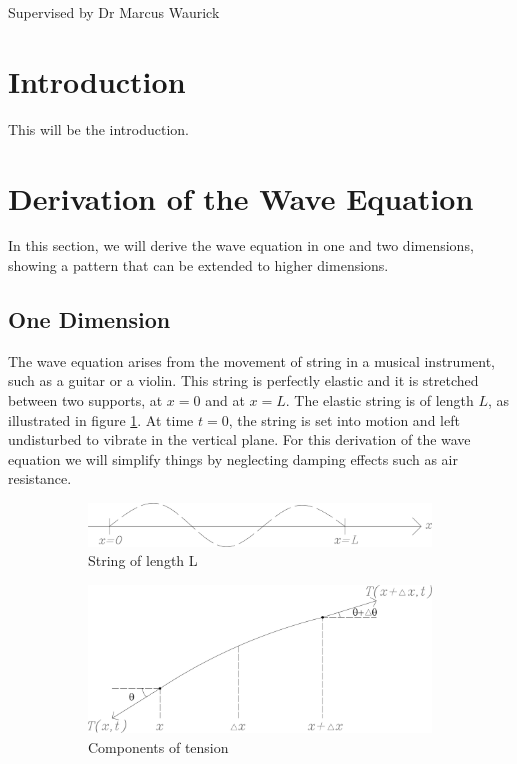 \documentclass[a4paper, 12pt]{article}
\numberwithin{equation}{section}
\begin{document}
    \vspace*{5cm}
    Supervised by Dr Marcus Waurick
    \newpage
    \normalsize
    \tableofcontents
    \newpage
    
    \section{Introduction}
    This will be the introduction.
    
    \section{Derivation of the Wave Equation}
    In this section, we will derive the wave equation in one and two dimensions, showing a pattern that 
can be extended to higher dimensions.

\subsection{One Dimension}
The wave equation arises from the movement of string in a musical instrument, such as a guitar or a violin.
\cite{BoyDiP} This string is perfectly elastic and
it is stretched between two supports, at $x=0$ and at $x=L$. The elastic string is of length $L$, as
illustrated in figure \ref{fig:1a}. At time $t=0$, the string is set into motion and left undisturbed to vibrate in the
vertical plane. For this derivation of the wave equation we will simplify things by neglecting damping 
effects such as air resistance.

\begin{figure}[h]
    \begin{subfigure}[t]{0.5\textwidth} 
        \includegraphics[width=0.9\linewidth]{images/grafic-1.png} 
        \caption{String of length L}
        \label{fig:1a}
    \end{subfigure}
    \begin{subfigure}[t]{0.5\textwidth}
        \includegraphics[width=0.9\linewidth]{images/grafic-2.png}
        \caption{Components of tension}
        \label{fig:1b}
    \end{subfigure}     
\caption{}
\label{fig:1}
\end{figure}
\end{document}
